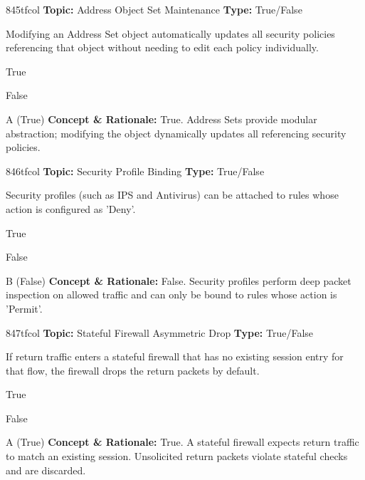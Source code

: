 \begin{qcard}{845}{tfcol}
\textcolor{darkslate!75}{\small\textbf{Topic:} Address Object Set Maintenance \hfill \textbf{Type:} True/False}\vspace{0.4em}\par
Modifying an Address Set object automatically updates all security policies referencing that object without needing to edit each policy individually.
\begin{qoptions}
\item True
\item False
\end{qoptions}
\end{qcard}
\nopagebreak
\begin{explainbox}{A (True)}
\textbf{Concept \& Rationale:} True. Address Sets provide modular abstraction; modifying the object dynamically updates all referencing security policies.
\end{explainbox}

\begin{qcard}{846}{tfcol}
\textcolor{darkslate!75}{\small\textbf{Topic:} Security Profile Binding \hfill \textbf{Type:} True/False}\vspace{0.4em}\par
Security profiles (such as IPS and Antivirus) can be attached to rules whose action is configured as 'Deny'.
\begin{qoptions}
\item True
\item False
\end{qoptions}
\end{qcard}
\nopagebreak
\begin{explainbox}{B (False)}
\textbf{Concept \& Rationale:} False. Security profiles perform deep packet inspection on allowed traffic and can only be bound to rules whose action is 'Permit'.
\end{explainbox}

\begin{qcard}{847}{tfcol}
\textcolor{darkslate!75}{\small\textbf{Topic:} Stateful Firewall Asymmetric Drop \hfill \textbf{Type:} True/False}\vspace{0.4em}\par
If return traffic enters a stateful firewall that has no existing session entry for that flow, the firewall drops the return packets by default.
\begin{qoptions}
\item True
\item False
\end{qoptions}
\end{qcard}
\nopagebreak
\begin{explainbox}{A (True)}
\textbf{Concept \& Rationale:} True. A stateful firewall expects return traffic to match an existing session. Unsolicited return packets violate stateful checks and are discarded.
\end{explainbox}

